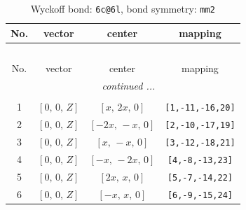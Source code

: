 \documentclass[fleqn,8pt]{jsarticle}
\begin{document}
\begin{longtable}{cccc}
\caption{Wyckoff bond: {\tt 6c@6l}, bond symmetry: {\tt mm2}}
 \\
 \hline \hline
No. & vector & center & mapping \\ \hline \endfirsthead

\multicolumn{3}{l}{\tablename\ \thetable{}} \\
 \hline \hline
No. & vector & center & mapping \\ \hline \endhead

 \hline \hline
\multicolumn{3}{r}{\footnotesize\it continued ...} \\ \endfoot

 \hline \hline
\multicolumn{3}{r}{} \\ \endlastfoot

1 & $\left[ 0,\, 0,\, Z \right]$ & $\left[ x,\, 2 x,\, 0 \right]$ & {\tt [1,-11,-16,20]} \\ \hline
2 & $\left[ 0,\, 0,\, Z \right]$ & $\left[ - 2 x,\, - x,\, 0 \right]$ & {\tt [2,-10,-17,19]} \\ \hline
3 & $\left[ 0,\, 0,\, Z \right]$ & $\left[ x,\, - x,\, 0 \right]$ & {\tt [3,-12,-18,21]} \\ \hline
4 & $\left[ 0,\, 0,\, Z \right]$ & $\left[ - x,\, - 2 x,\, 0 \right]$ & {\tt [4,-8,-13,23]} \\ \hline
5 & $\left[ 0,\, 0,\, Z \right]$ & $\left[ 2 x,\, x,\, 0 \right]$ & {\tt [5,-7,-14,22]} \\ \hline
6 & $\left[ 0,\, 0,\, Z \right]$ & $\left[ - x,\, x,\, 0 \right]$ & {\tt [6,-9,-15,24]} \\
\end{longtable}
\renewcommand{\arraystretch}{1.2}
\end{document}

